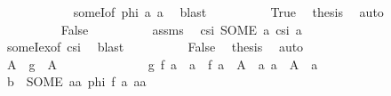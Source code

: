 \begin{isabellebody}
\ \ \ \ \ \ \ \ \ \ \isamarkupfalse%
\ someI{\isacharbrackleft}{\kern0pt}of\ {\isachardoublequoteopen}{\isacharquery}{\kern0pt}phi\ a{\isacharprime}{\kern0pt}{\isachardoublequoteclose}\ a{\isacharbrackright}{\kern0pt}\ \isamarkupfalse%
\ blast\isanewline
\ \ \ \ \ \ \ \ \isamarkupfalse%
\ True\ \isamarkupfalse%
\ {\isacharquery}{\kern0pt}thesis\ \isamarkupfalse%
\ auto\isanewline
\ \ \ \ \ \ \isamarkupfalse%
\isanewline
\ \ \ \ \ \ \ \ \isamarkupfalse%
\ False\isanewline
\ \ \ \ \ \ \ \ \isamarkupfalse%
\ assms\ \isamarkupfalse%
\ {\isachardoublequoteopen}{\isacharquery}{\kern0pt}csi\ {\isacharparenleft}{\kern0pt}SOME\ a{\isachardot}{\kern0pt}\ {\isacharquery}{\kern0pt}csi\ a{\isacharparenright}{\kern0pt}{\isachardoublequoteclose}\isanewline
\ \ \ \ \ \ \ \ \ \ \isamarkupfalse%
\ someI{\isacharunderscore}{\kern0pt}ex{\isacharbrackleft}{\kern0pt}of\ {\isacharquery}{\kern0pt}csi{\isacharbrackright}{\kern0pt}\ \isamarkupfalse%
\ blast\isanewline
\ \ \ \ \ \ \ \ \isamarkupfalse%
\ False\ \isamarkupfalse%
\ {\isacharquery}{\kern0pt}thesis\ \isamarkupfalse%
\ auto\isanewline
\ \ \ \ \ \ \isamarkupfalse%
\isanewline
\ \ \ \ \isamarkupfalse%
\isanewline
\ \ \isamarkupfalse%
\isanewline
\ \ \ \ \isamarkupfalse%
\ {\isachardoublequoteopen}A\ {\isasymsubseteq}\ {\isacharquery}{\kern0pt}g\ {\isacharbackquote}{\kern0pt}\ A{\isacharprime}{\kern0pt}{\isachardoublequoteclose}\isanewline
\ \ \ \ \isamarkupfalse%
\ {\isacharminus}{\kern0pt}\isanewline
\ \ \ \ \ \ \isamarkupfalse%
\ {\isachardoublequoteopen}{\isacharquery}{\kern0pt}g\ {\isacharparenleft}{\kern0pt}f\ a{\isacharparenright}{\kern0pt}\ {\isacharequal}{\kern0pt}\ a\ {\isasymand}\ f\ a\ {\isasymin}\ A{\isacharprime}{\kern0pt}{\isachardoublequoteclose}\ \ a{\isacharcolon}{\kern0pt}\ {\isachardoublequoteopen}a\ {\isasymin}\ A{\isachardoublequoteclose}\ \ a\isanewline
\ \ \ \ \ \ \isamarkupfalse%
\ {\isacharminus}{\kern0pt}\isanewline
\ \ \ \ \ \ \ \ \isamarkupfalse%
\ {\isacharquery}{\kern0pt}b\ {\isacharequal}{\kern0pt}\ {\isachardoublequoteopen}SOME\ aa{\isachardot}{\kern0pt}\ {\isacharquery}{\kern0pt}phi\ {\isacharparenleft}{\kern0pt}f\ a{\isacharparenright}{\kern0pt}\ aa{\isachardoublequoteclose}\isanewline
\ \ \ \ \ \ \ \ \isamarkupfalse%

\end{isabellebody}
